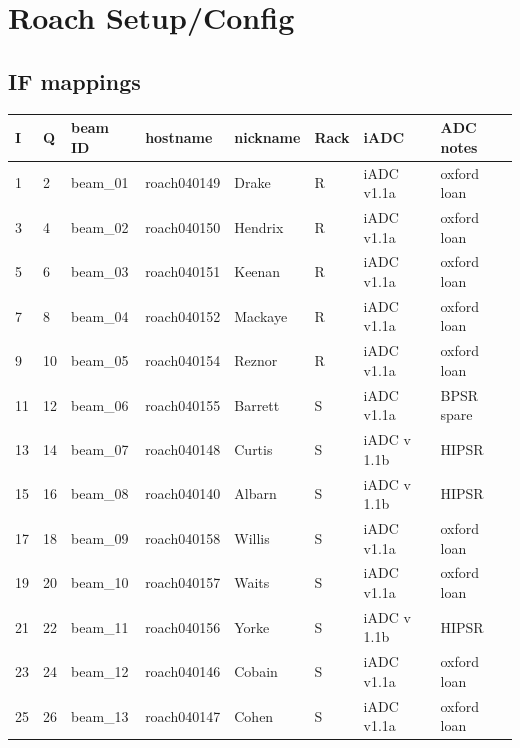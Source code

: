\documentclass[letterpaper,10pt,english]{sphinxmanual}
\begin{document}
\chapter{Roach Setup/Config}
\label{ip_allocation:roach-setup-config}\label{ip_allocation::doc}

\section{IF mappings}
\label{ip_allocation:if-mappings}
\begin{tabulary}{\linewidth}{|L|L|L|L|L|L|L|L|}
\hline
\textbf{\relax 
I
} & \textbf{\relax 
Q
} & \textbf{\relax 
beam ID
} & \textbf{\relax 
hostname
} & \textbf{\relax 
nickname
} & \textbf{\relax 
Rack
} & \textbf{\relax 
iADC
} & \textbf{\relax 
ADC notes
}\\\hline

1
 & 
2
 & 
beam\_01
 & 
roach040149
 & 
Drake
 & 
R
 & 
iADC v1.1a
 & 
oxford loan
\\\hline

3
 & 
4
 & 
beam\_02
 & 
roach040150
 & 
Hendrix
 & 
R
 & 
iADC v1.1a
 & 
oxford loan
\\\hline

5
 & 
6
 & 
beam\_03
 & 
roach040151
 & 
Keenan
 & 
R
 & 
iADC v1.1a
 & 
oxford loan
\\\hline

7
 & 
8
 & 
beam\_04
 & 
roach040152
 & 
Mackaye
 & 
R
 & 
iADC v1.1a
 & 
oxford loan
\\\hline

9
 & 
10
 & 
beam\_05
 & 
roach040154
 & 
Reznor
 & 
R
 & 
iADC v1.1a
 & 
oxford loan
\\\hline

11
 & 
12
 & 
beam\_06
 & 
roach040155
 & 
Barrett
 & 
S
 & 
iADC v1.1a
 & 
BPSR spare
\\\hline

13
 & 
14
 & 
beam\_07
 & 
roach040148
 & 
Curtis
 & 
S
 & 
iADC v 1.1b
 & 
HIPSR
\\\hline

15
 & 
16
 & 
beam\_08
 & 
roach040140
 & 
Albarn
 & 
S
 & 
iADC v 1.1b
 & 
HIPSR
\\\hline

17
 & 
18
 & 
beam\_09
 & 
roach040158
 & 
Willis
 & 
S
 & 
iADC v1.1a
 & 
oxford loan
\\\hline

19
 & 
20
 & 
beam\_10
 & 
roach040157
 & 
Waits
 & 
S
 & 
iADC v1.1a
 & 
oxford loan
\\\hline

21
 & 
22
 & 
beam\_11
 & 
roach040156
 & 
Yorke
 & 
S
 & 
iADC v 1.1b
 & 
HIPSR
\\\hline

23
 & 
24
 & 
beam\_12
 & 
roach040146
 & 
Cobain
 & 
S
 & 
iADC v1.1a
 & 
oxford loan
\\\hline

25
 & 
26
 & 
beam\_13
 & 
roach040147
 & 
Cohen
 & 
S
 & 
iADC v1.1a
 & 
oxford loan
\\\hline
\end{tabulary}
\end{document}
